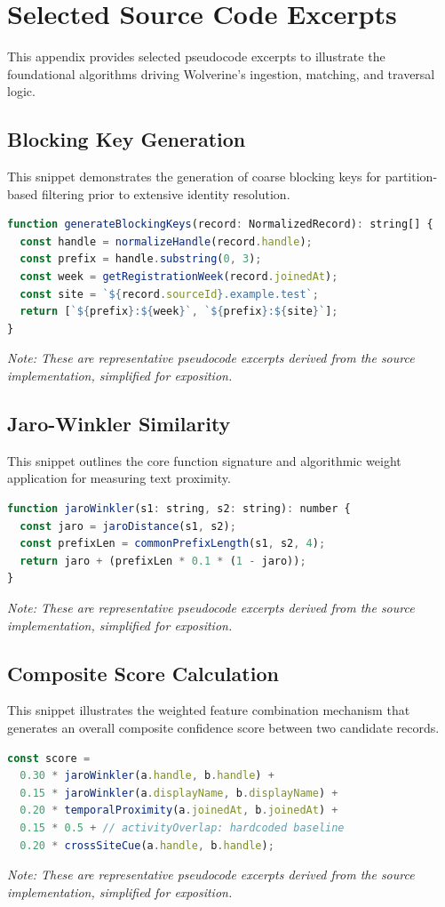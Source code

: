 \chapter{Selected Source Code Excerpts}
\label{app:source-excerpts}

This appendix provides selected pseudocode excerpts to illustrate the foundational algorithms driving Wolverine's ingestion, matching, and traversal logic. 

\section{Blocking Key Generation}
This snippet demonstrates the generation of coarse blocking keys for partition-based filtering prior to extensive identity resolution.
\begin{lstlisting}[language=JavaScript]
function generateBlockingKeys(record: NormalizedRecord): string[] {
  const handle = normalizeHandle(record.handle);
  const prefix = handle.substring(0, 3);
  const week = getRegistrationWeek(record.joinedAt);
  const site = `${record.sourceId}.example.test`;
  return [`${prefix}:${week}`, `${prefix}:${site}`];
}
\end{lstlisting}
\textit{Note: These are representative pseudocode excerpts derived from the source implementation, simplified for exposition.}

\section{Jaro-Winkler Similarity}
This snippet outlines the core function signature and algorithmic weight application for measuring text proximity.
\begin{lstlisting}[language=JavaScript]
function jaroWinkler(s1: string, s2: string): number {
  const jaro = jaroDistance(s1, s2);
  const prefixLen = commonPrefixLength(s1, s2, 4);
  return jaro + (prefixLen * 0.1 * (1 - jaro));
}
\end{lstlisting}
\textit{Note: These are representative pseudocode excerpts derived from the source implementation, simplified for exposition.}

\section{Composite Score Calculation}
This snippet illustrates the weighted feature combination mechanism that generates an overall composite confidence score between two candidate records.
\begin{lstlisting}[language=JavaScript]
const score =
  0.30 * jaroWinkler(a.handle, b.handle) +
  0.15 * jaroWinkler(a.displayName, b.displayName) +
  0.20 * temporalProximity(a.joinedAt, b.joinedAt) +
  0.15 * 0.5 + // activityOverlap: hardcoded baseline
  0.20 * crossSiteCue(a.handle, b.handle);
\end{lstlisting}
\textit{Note: These are representative pseudocode excerpts derived from the source implementation, simplified for exposition.}

